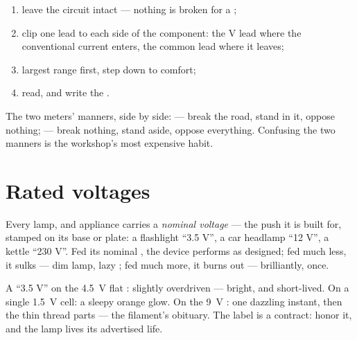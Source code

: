 \begin{method}\label{met:g8:voltage-voltmeter:measure}
\begin{enumerate}
  \item leave the circuit intact --- nothing is broken for a
        ;
  \item clip one lead to each side of the component: the
        \unit{V} lead where the conventional current enters,
        the common lead where it leaves;
  \item largest range first, step down to comfort;
  \item read, and write the .
\end{enumerate}
The two meters' manners, side by side:  --- break the
road, stand in it, oppose nothing;  --- break
nothing, stand aside, oppose everything. Confusing the two
manners is the workshop's most expensive habit.
\end{method}

\section{Rated voltages}

\begin{definition}\label{def:g8:voltage-voltmeter:nominal}
Every lamp,  and appliance carries a \emph{nominal
voltage} --- the push it is built for,
stamped on its base or plate: a flashlight  ``3.5 V'', a
car headlamp ``12 V'', a kettle ``230 V''. Fed its nominal
, the device performs as designed; fed much less, it
sulks --- dim lamp, lazy ; fed much more, it burns out ---
brilliantly, once.
\end{definition}

\begin{example}\label{ex:g8:voltage-voltmeter:matching}
A ``3.5 V''  on the \qty{4.5}{V} flat : slightly
overdriven --- bright, and short-lived. On a single
\qty{1.5}{V} cell: a sleepy orange glow. On the \qty{9}{V}
: one dazzling instant, then the thin thread parts ---
the filament's obituary. The label is a contract: honor it, and
the lamp lives its advertised life.
\end{example}

